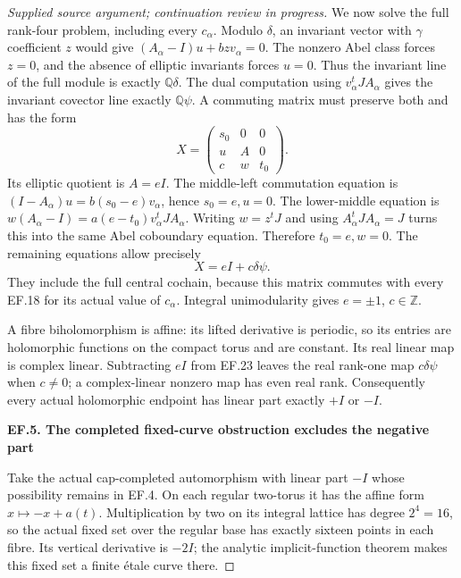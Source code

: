 \begin{proof}[Supplied source argument; continuation review in progress]
We now solve the full rank-four problem, including every
\(c_\alpha\). Modulo \(\delta\), an invariant vector with
\(\gamma\) coefficient \(z\) would give
\((A_\alpha-I)u+bzv_\alpha=0\). The nonzero Abel class forces
\(z=0\), and the absence of elliptic invariants forces \(u=0\).
Thus the invariant line of the full module is exactly
\(\mathbb Q\delta\). The dual computation using
\(v_\alpha^tJA_\alpha\) gives the invariant covector line exactly
\(\mathbb Q\psi\). A commuting matrix must preserve both and has
the form
\[
 X=\begin{pmatrix}
 s_0&0&0\\ u&A&0\\ c&w&t_0
 \end{pmatrix}.
 \tag{EF.22}
\]
Its elliptic quotient is \(A=eI\). The middle-left commutation
equation is
\((I-A_\alpha)u=b(s_0-e)v_\alpha\), hence \(s_0=e,u=0\).
The lower-middle equation is
\(w(A_\alpha-I)=a(e-t_0)v_\alpha^tJA_\alpha\).
Writing \(w=z^tJ\) and using \(A_\alpha^tJA_\alpha=J\) turns
this into the same Abel coboundary equation. Therefore
\(t_0=e,w=0\). The remaining equations allow precisely
\[
                 X=eI+c\delta\psi.
 \tag{EF.23}
\]
They include the full central cochain, because this matrix commutes
with every EF.18 for its actual value of \(c_\alpha\). Integral
unimodularity gives \(e=\pm1\), \(c\in\mathbb Z\).

A fibre biholomorphism is affine: its lifted derivative is periodic,
so its entries are holomorphic functions on the compact torus and are
constant. Its real linear map is complex linear. Subtracting
\(eI\) from EF.23 leaves the real rank-one map \(c\delta\psi\)
when \(c\ne0\); a complex-linear nonzero map has even real rank.
Consequently every actual holomorphic endpoint has linear part exactly
\(+I\) or \(-I\).

\par

\medskip\noindent\textbf{EF.5. The completed fixed-curve obstruction excludes the negative part}

\par\nobreak

Take the actual cap-completed automorphism with linear part \(-I\)
whose possibility remains in EF.4. On each regular two-torus it has
the affine form \(x\mapsto-x+a(t)\). Multiplication by two on its
integral lattice has degree \(2^4=16\), so the actual fixed set over
the regular base has exactly sixteen points in each fibre. Its vertical
derivative is \(-2I\); the analytic implicit-function theorem makes
this fixed set a finite étale curve there.


\end{proof}
